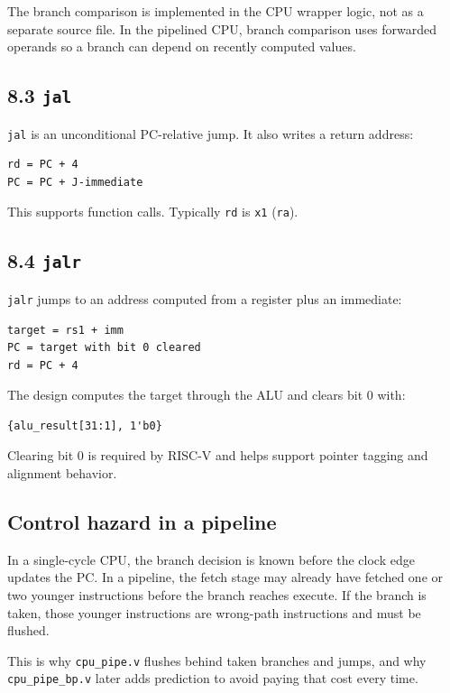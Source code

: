 The branch comparison is implemented in the CPU wrapper logic, not as a separate source file. In the pipelined CPU, branch comparison uses forwarded operands so a branch can depend on recently computed values.

\subsection{8.3 \texttt{jal}}

\texttt{jal} is an unconditional PC-relative jump. It also writes a return address:

\begin{lstlisting}[language={}]
rd = PC + 4
PC = PC + J-immediate
\end{lstlisting}

This supports function calls. Typically \texttt{rd} is \texttt{x1} (\texttt{ra}).

\subsection{8.4 \texttt{jalr}}

\texttt{jalr} jumps to an address computed from a register plus an immediate:

\begin{lstlisting}[language={}]
target = rs1 + imm
PC = target with bit 0 cleared
rd = PC + 4
\end{lstlisting}

The design computes the target through the ALU and clears bit 0 with:

\begin{lstlisting}[language={}]
{alu_result[31:1], 1'b0}
\end{lstlisting}

Clearing bit 0 is required by RISC-V and helps support pointer tagging and alignment behavior.

\subsection{Control hazard in a pipeline}

In a single-cycle CPU, the branch decision is known before the clock edge updates the PC. In a pipeline, the fetch stage may already have fetched one or two younger instructions before the branch reaches execute. If the branch is taken, those younger instructions are wrong-path instructions and must be flushed.

This is why \texttt{cpu\_pipe.v} flushes behind taken branches and jumps, and why \texttt{cpu\_pipe\_bp.v} later adds prediction to avoid paying that cost every time.

\bigskip
